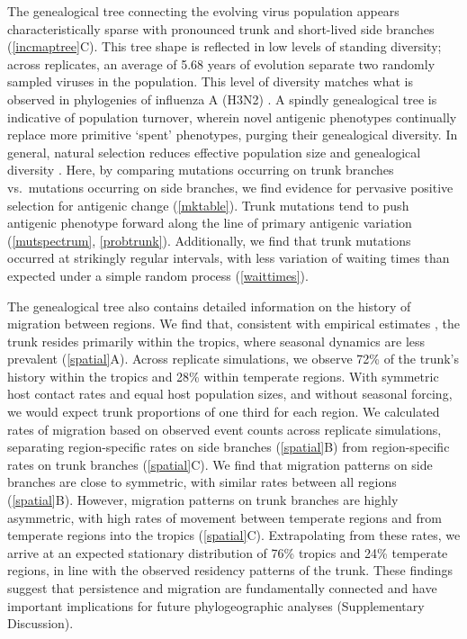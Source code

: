 The genealogical tree connecting the evolving virus population appears characteristically sparse with pronounced trunk and short-lived side branches  (\ref{incmaptree}C).  This tree shape is reflected in low levels of standing diversity; across replicates, an average of 5.68 years of evolution separate two randomly sampled viruses in the population.  This level of diversity matches what is observed in phylogenies of influenza A (H3N2) \cite{Rambaut08}.  A spindly genealogical tree is indicative of population turnover, wherein novel antigenic phenotypes continually replace more primitive `spent' phenotypes, purging their genealogical diversity.  In general, natural selection reduces effective population size and genealogical diversity \cite{BedfordBMC11}.  Here, by comparing mutations occurring on trunk branches vs.\ mutations occurring on side branches, we find evidence for pervasive positive selection for antigenic change (\ref{mktable}).  Trunk mutations tend to push antigenic phenotype forward along the line of primary antigenic variation (\ref{mutspectrum}, \ref{probtrunk}).  Additionally, we find that trunk mutations occurred at strikingly regular intervals, with less variation of waiting times than expected under a simple random process (\ref{waittimes}).

The genealogical tree also contains detailed information on the history of migration between regions.  We find that, consistent with empirical estimates \cite{Russell08,Bedford10}, the trunk resides primarily within the tropics, where seasonal dynamics are less prevalent (\ref{spatial}A).  Across replicate simulations, we observe 72\% of the trunk's history within the tropics and 28\% within temperate regions.  With symmetric host contact rates and equal host population sizes, and without seasonal forcing, we would expect trunk proportions of one third for each region.  We calculated rates of migration based on observed event counts across replicate simulations, separating region-specific rates on side branches (\ref{spatial}B) from region-specific rates on trunk branches (\ref{spatial}C).  We find that migration patterns on side branches are close to symmetric, with similar rates between all regions (\ref{spatial}B).  However, migration patterns on trunk branches are highly asymmetric, with high rates of movement between temperate regions and from temperate regions into the tropics (\ref{spatial}C).  Extrapolating from these rates, we arrive at an expected stationary distribution of 76\% tropics and 24\% temperate regions, in line with the observed residency patterns of the trunk.  These findings suggest that persistence and migration are fundamentally connected and have important implications for future phylogeographic analyses (Supplementary Discussion).

